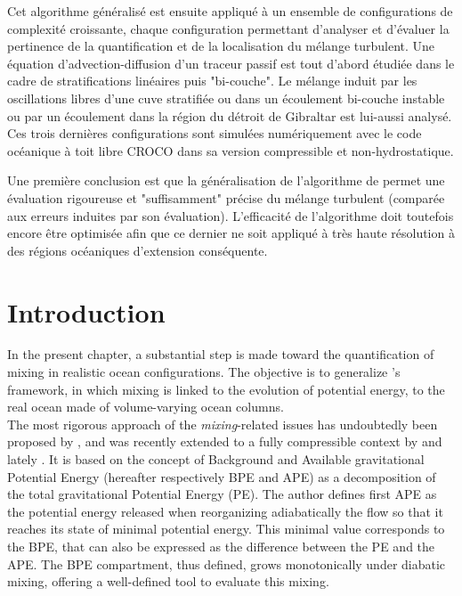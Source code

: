 Cet algorithme généralisé est ensuite appliqué à un ensemble de configurations de complexité croissante, chaque configuration permettant d'analyser et d'évaluer la pertinence de la quantification et de la localisation du mélange turbulent. Une équation d'advection-diffusion d'un traceur passif est tout d'abord étudiée dans le cadre de stratifications linéaires puis "bi-couche". Le mélange induit par les oscillations libres d'une cuve stratifiée ou dans un écoulement bi-couche instable ou par un écoulement dans la région du détroit de Gibraltar est lui-aussi analysé. Ces trois dernières configurations sont simulées numériquement avec le code océanique à toit libre CROCO dans sa version compressible et non-hydrostatique.

Une première conclusion est que la généralisation de l'algorithme de \cite{winters_available_1995} permet une évaluation rigoureuse et "suffisamment" précise du mélange turbulent (comparée aux erreurs induites par son évaluation). L'efficacité de l'algorithme doit toutefois encore être optimisée afin que ce dernier ne soit appliqué à très haute résolution à des régions océaniques d'extension conséquente.

\section{Introduction}

In the present chapter, a substantial step is made toward the quantification of mixing in realistic ocean configurations. The objective is to generalize \citet{winters_available_1995}'s framework, in which mixing is linked to the evolution of potential energy, to the real ocean made of volume-varying ocean columns.\\

The most rigorous approach of the \textit{mixing}-related issues has undoubtedly been proposed by \cite{lorenz_available_1955}, and was recently extended to a fully compressible context by \cite{tailleux_energetics_2009} and lately \cite{tailleux_irreversible_2013}. It is based on the concept of Background and Available gravitational Potential Energy (hereafter respectively BPE and APE) as a decomposition of the total gravitational Potential Energy (PE). The author defines first APE as the potential energy released when reorganizing adiabatically the flow so that it reaches its state of minimal potential energy. This minimal value corresponds to the BPE, that can also be expressed as the difference between the PE and the APE. The BPE compartment, thus defined, grows monotonically under diabatic mixing, offering a well-defined tool to evaluate this mixing.

